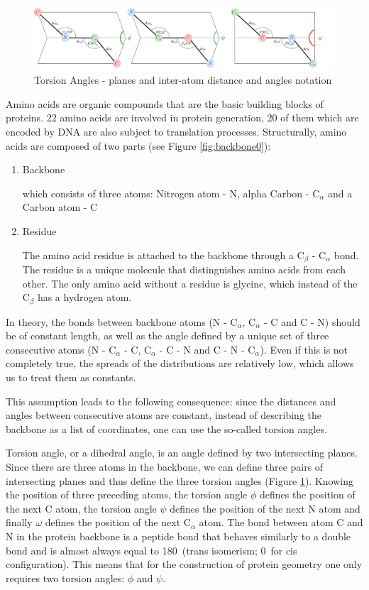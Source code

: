\begin{figure}
    \centering
    \includegraphics[width=\linewidth]{imgs_tomas/torsion.png}
    \caption{Torsion Angles - planes and inter-atom distance and angles notation}
    \label{fig:torsion}
\end{figure}

Amino acids are organic compounds that are the basic building blocks of proteins. 
22 amino acids are involved in protein generation, 20 of them which are encoded by DNA are also subject to translation processes. 
Structurally, amino acids are composed of two parts (see Figure \ref{fig:backbone0}):

\begin{enumerate}
    \item Backbone
    
        which consists of three atoms: Nitrogen atom - N, alpha Carbon - C$_\alpha$ and a Carbon atom - C
    \item Residue
        
        The amino acid residue is attached to the backbone through a C$_\beta$ - C$_\alpha$ bond. The residue is a unique molecule that distinguishes amino acids from each other. The only amino acid without a residue is glycine, which instead of the C$_\beta$ has a hydrogen atom.
\end{enumerate}

In theory, the bonds between backbone atoms (N - C$_\alpha$, C$_\alpha$ - C and C - N) should be of constant length, as well as the angle defined by a unique set of three consecutive atoms (N - C$_\alpha$ - C, C$_\alpha$ - C - N and C - N - C$_\alpha$). 
Even if this is not completely true, the spreads of the distributions are relatively low, which allows us to treat them as constants.

This assumption leads to the following consequence: since the distances and angles between consecutive atoms are constant, instead of describing the backbone as a list of coordinates, one can use the so-called torsion angles.

Torsion angle, or a dihedral angle, is an angle defined by two intersecting planes. 
Since there are three atoms in the backbone, we can define three pairs of intersecting planes and thus define the three torsion angles (Figure \ref{fig:torsion}). 
Knowing the position of three preceding atoms, the torsion angle $\phi$ defines the position of the next C atom, the torsion angle $\psi$ defines the position of the next N atom and finally $\omega$ defines the position of the next C$_\alpha$ atom. 
The bond between atom C and N in the protein backbone is a peptide bond that behaves similarly to a double bond and is almost always equal to 180\degree~(trans isomerism; 0\degree~for cis configuration). 
This means that for the construction of protein geometry one only requires two torsion angles: $\phi$ and $\psi$.

